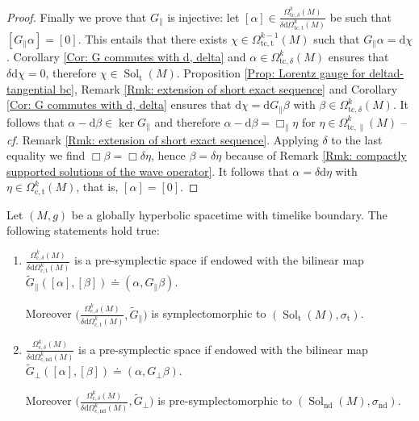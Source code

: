 \begin{proof}
	Finally we prove that $G_\parallel$ is injective: let $[\alpha]\in\frac{\Omega_{\mathrm{tc},\delta}^k(M)}{\delta\mathrm{d}\Omega_{\mathrm{tc},\mathrm{t}}^k(M)}$ be such that $[G_\parallel\alpha]=[0]$.
	This entails that there exists $\chi\in\Omega^{k-1}_{\mathrm{tc,t}}(M)$ such that $G_\parallel\alpha=\mathrm{d}\chi$.
	Corollary \ref{Cor: G commutes with d, delta} and $\alpha\in\Omega_{\mathrm{tc},\delta}^k(M)$ ensures that $\delta\mathrm{d}\chi=0$, therefore $\chi\in\operatorname{Sol}_{\mathrm{t}}(M)$.
	Proposition \ref{Prop: Lorentz gauge for deltad-tangential bc}, Remark \ref{Rmk: extension of short exact sequence} and Corollary \ref{Cor: G commutes with d, delta} ensures that $\mathrm{d}\chi=\mathrm{d}G_\parallel\beta$ with $\beta\in\Omega_{\mathrm{tc},\delta}^k(M)$.
	It follows that $\alpha-\mathrm{d}\beta\in\ker G_\parallel$ and therefore $\alpha-\mathrm{d}\beta=\Box_\parallel\eta$ for $\eta\in\Omega_{\mathrm{tc},\parallel}^k(M)$ -- \textit{cf.} Remark \ref{Rmk: extension of short exact sequence}.
	Applying $\delta$ to the last equality we find $\Box\beta=\Box\delta\eta$, hence $\beta=\delta\eta$ because of Remark \ref{Rmk: compactly supported solutions of the wave operator}.
	It follows that $\alpha=\delta\mathrm{d}\eta$ with $\eta\in\Omega_{\mathrm{c,t}}^k(M)$, that is, $[\alpha]=[0]$.
\end{proof} 

\begin{propositio}\label{Prop: proof presymplectomorphism for spacelike solution spaces}
	Let $(M,g)$ be a globally hyperbolic spacetime with timelike boundary.
	The following statements hold true:
	\begin{enumerate}
		\item
		$\frac{\Omega^k_{\mathrm{c},\delta}(M)}{\delta\mathrm{d}\Omega_{\mathrm{c},\mathrm{t}}^k(M)}$ is a pre-symplectic space if endowed with the bilinear map $\widetilde{G}_\parallel([\alpha],[\beta])\doteq(\alpha,G_\parallel\beta)$.
		
		Moreover $\bigg(\frac{\Omega^k_{\mathrm{c},\delta}(M)}{\delta\mathrm{d}\Omega_{\mathrm{c},\mathrm{t}}^k(M)},\widetilde{G}_\parallel\bigg)$ is symplectomorphic to $(\operatorname{Sol}_{\mathrm{t}}(M),\sigma_{\mathrm{t}})$.
		\item
		$\frac{\Omega^k_{\mathrm{c},\delta}(M)}{\delta\mathrm{d}\Omega_{\mathrm{c,nd}}^k(M)}$ is a pre-symplectic space
		if endowed with the bilinear map $\widetilde{G}_\perp([\alpha],[\beta])\doteq(\alpha,G_\perp\beta)$.
		
		Moreover $\bigg(\frac{\Omega^k_{\mathrm{c},\delta}(M)}{\delta\mathrm{d}\Omega_{\mathrm{c},\mathrm{nd}}^k(M)},\widetilde{G}_\perp\bigg)$ is pre-symplectomorphic to $(\operatorname{Sol}_{\mathrm{nd}}(M),\sigma_{\mathrm{nd}})$.
	\end{enumerate}  
\end{propositio}

